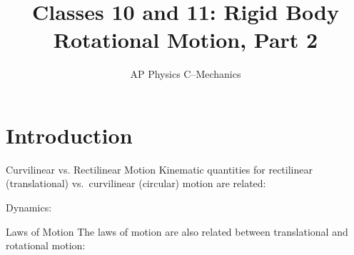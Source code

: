 \documentclass[12pt,compress,aspectratio=169]{beamer}
\title{Classes 10 and 11: Rigid Body Rotational Motion, Part 2}
\subtitle{AP Physics C--Mechanics}
\begin{document}
\begin{frame}
  \maketitle
\end{frame}



\section{Introduction}

\begin{frame}{Curvilinear vs. Rectilinear Motion}
  Kinematic quantities for rectilinear (translational) vs.\ curvilinear
  (circular) motion are related:

  \vspace{-.3in}{\large
    \begin{align*}
      \vec r &\quad\to\quad \theta \\
      \vec v &\quad\to\quad \omega \\
      \vec a &\quad\to\quad \alpha
    \end{align*}
  }

  Dynamics:
  
  \vspace{-.3in}{\large
    \begin{align*}
      m &\quad\to\quad I\\
      \vec F &\quad\to\quad \tau\\
      \vec p=m\vec v &\quad\to\quad L=I\omega
    \end{align*}
  }
\end{frame}



\begin{frame}{Laws of Motion}
  The laws of motion are also related between translational and rotational
  motion:
  
\end{frame}
\end{document}
